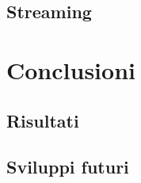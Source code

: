 \documentclass[conference]{IEEEtran}
\begin{document}
	\subsection{Streaming}





\section{Conclusioni}
	
	\subsection{Risultati}

	\subsection{Sviluppi futuri}

	




%
%

\end{document}
